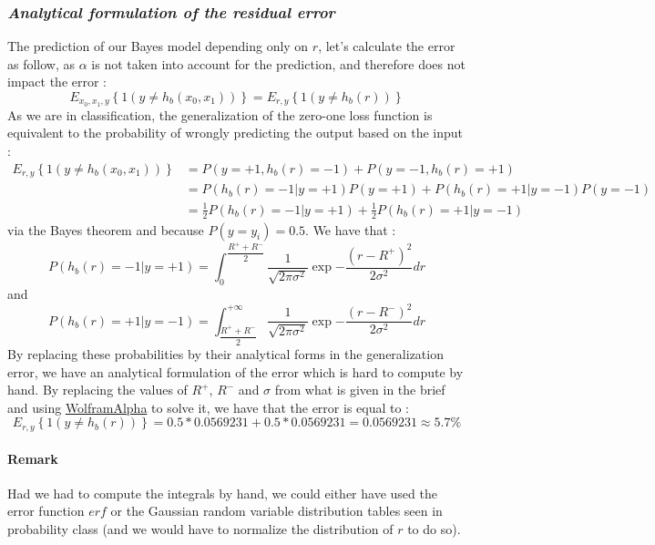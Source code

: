 \subsubsection{{\it Analytical formulation of the residual error}}
The prediction of our Bayes model depending only on $r$, let's calculate the error as follow, as $\alpha$ is not taken into account for the prediction, and therefore does not impact the error :
$$
E_{x_{0}, x_{1}, y}\left\{1\left(y \neq h_{b}\left(x_{0}, x_{1}\right)\right)\right\} = E_{r, y}\left\{1\left(y \neq h_{b}\left(r\right)\right)\right\}
$$
As we are in classification, the generalization of the zero-one loss function is equivalent to the probability of wrongly predicting the output based on the input :
\begin{align*}
    E_{r,y}\left\{1\left(y \neq h_{b}\left(x_{0}, x_{1}\right)\right)\right\} &= P(y = +1, h_b(r) = -1) + P(y = -1, h_b(r) = +1)\\
    &= P(h_b(r) = -1 | y = +1)P(y = +1) + P(h_b(r) = +1 | y = -1)P(y = -1)\\
    &= \frac{1}{2}P(h_b(r) = -1 | y = +1) + \frac{1}{2}P(h_b(r) = +1 | y = -1)
\end{align*}
via the Bayes theorem and because $P(y = y_i) = 0.5$. We have that : 
$$
P(h_b(r) = -1 | y = +1) = \int_{0}^{\dfrac{R^+ + R^-}{2}} \dfrac{1}{\sqrt{2\pi\sigma^2}} \exp{-\dfrac{(r - R^+)^2}{2\sigma^2}} dr
$$
and
$$
P(h_b(r) = +1 | y = -1) = \int_{\dfrac{R^+ + R^-}{2}}^{+\infty} \dfrac{1}{\sqrt{2\pi\sigma^2}} \exp{-\dfrac{(r - R^-)^2}{2\sigma^2}} dr
$$
By replacing these probabilities by their analytical forms in the generalization error, we have an analytical formulation of the error which is hard to compute by hand. By replacing the values of $R^+$, $R^-$ and $\sigma$ from what is given in the brief and using \href{https://www.wolframalpha.com}{WolframAlpha} to solve it, we have that the error is equal to :
$$
E_{r, y}\left\{1\left(y \neq h_{b}\left(r\right)\right)\right\} = 0.5 * 0.0569231 + 0.5 * 0.0569231 = 0.0569231 \approx 5.7\%
$$
\paragraph{Remark} Had we had to compute the integrals by hand, we could either have used the error function $erf$ or the Gaussian random variable distribution tables seen in probability class (and we would have to normalize the distribution of $r$ to do so).
